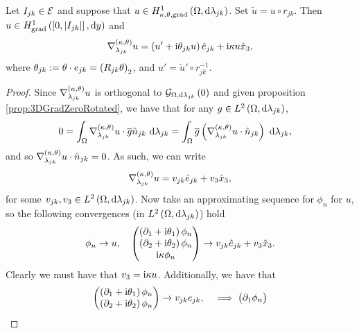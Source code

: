 \begin{cory} \label{cory:3DTangGradRotated}
	Let $I_{jk}\in\mathcal{E}$ and suppose that $u\in H^1_{\kappa,\theta,\mathrm{grad}}\left( \Omega, \mathrm{d}\lambda_{jk} \right)$.
	Set $\widetilde{u} = u\circ r_{jk}$.
	Then $u\in H^1_\mathrm{grad}\left( \left[ 0,\left\lvert I_{jk} \right\rvert \right], \mathrm{d}y \right)$ and 
	\begin{align*}
		\nabla^{\left( \kappa, \theta \right)}_{\lambda_{jk}}u = \left( u'+\mathrm{i}\theta_{jk}u \right)\hat{e}_{jk} + \mathrm{i}\kappa u\hat{x}_3,
	\end{align*}
	where $\theta_{jk}:=\theta\cdot e_{jk} = \left( R_{jk}\theta \right)_2$, and $u' = \widetilde{u}'\circ r_{jk}^{-1}$.
\end{cory}
\begin{proof}
	Since $\nabla^{\left( \kappa, \theta \right)}_{\lambda_{jk}}u$ is orthogonal to $\mathcal{G}_{ \Omega, \mathrm{d}\lambda_{jk}}\left( 0 \right)$ and given proposition \ref{prop:3DGradZeroRotated}, we have that for any $g\in L^{2}\left( \Omega,\mathrm{d}\lambda_{jk} \right)$,
	\begin{align*}
		0 &= \int_{\Omega} \nabla^{\left( \kappa, \theta \right)}_{\lambda_{jk}}u \cdot \overline{g}\hat{n}_{jk}  \ \mathrm{d}\lambda_{jk}
		= \int_{\Omega} \overline{g}\left( \nabla^{\left( \kappa, \theta \right)}_{\lambda_{jk}}u\cdot\hat{n}_{jk} \right)  \ \mathrm{d}\lambda_{jk},
	\end{align*}
	and so $\nabla^{\left( \kappa, \theta \right)}_{\lambda_{jk}}u\cdot\hat{n}_{jk}=0$.
	As such, we can write
	\begin{align*}
		\nabla^{\left( \kappa, \theta \right)}_{\lambda_{jk}}u = v_{jk}\hat{e}_{jk} + v_3\hat{x}_3,
	\end{align*}
	for some $v_{jk},v_3\in L^{2}\left( \Omega,\mathrm{d}\lambda_{jk} \right)$.
	Now take an approximating sequence for $\phi_n$ for $u$, so the following convergences (in $L^{2}\left( \Omega,\mathrm{d}\lambda_{jk} \right)$) hold
	\begin{align*}
		\phi_n \rightarrow u, \quad 
		\begin{pmatrix}
			\left(  \partial_1 + \mathrm{i}\theta_1  \right)\phi_n \\
			\left(  \partial_2 + \mathrm{i}\theta_2  \right)\phi_n \\
			\mathrm{i}\kappa\phi_n
		\end{pmatrix}
		\rightarrow v_{jk}\hat{e}_{jk} + v_3\hat{x}_3.
	\end{align*}
	Clearly we must have that $v_3 = \mathrm{i}\kappa u$.
	Additionally, we have that
	\begin{align*}
		\begin{pmatrix}
			\left(  \partial_1 + \mathrm{i}\theta_1  \right)\phi_n \\
			\left(  \partial_2 + \mathrm{i}\theta_2  \right)\phi_n
		\end{pmatrix}
		\rightarrow v_{jk}e_{jk},
		\quad \implies
		\begin{pmatrix}
			\partial_1\phi_n \\

\end{pmatrix}
\end{align*}
\end{proof}
